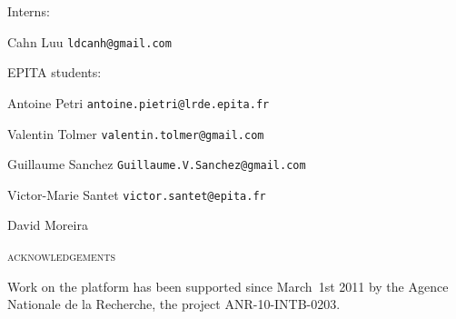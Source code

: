 \begin{titlepage}
{\bigskip
\noindent
Interns:
\medskip

\noindent
Cahn Luu
\PushLine
{\tt ldcanh@gmail.com}

\bigskip
\noindent
EPITA students:
\medskip

\noindent
Antoine Petri
\PushLine
{\tt antoine.pietri@lrde.epita.fr}

\noindent
Valentin Tolmer
\PushLine
{\tt valentin.tolmer@gmail.com}

\noindent
Guillaume Sanchez
\PushLine
{\tt Guillaume.V.Sanchez@gmail.com}

\noindent
Victor-Marie Santet
\PushLine
{\tt victor.santet@epita.fr}

\noindent
David Moreira
\PushLine
{} %

\bigskip
\noindent
{}

\medskip
\noindent
{}

\medskip

\vspace*{20pt}

\begin{center}
        \textsc{acknowledgements}
    \end{center}

\noindent
Work on the \vcsn platform has been supported since March~1st 2011 by
the Agence Nationale de la Recherche,  the project
ANR-10-INTB-0203.}


\smallskip
\noindent
{}
\end{titlepage}

\titlepage
\dominitoc %
\cleardoublepage
\setcounter{page}{3} %
